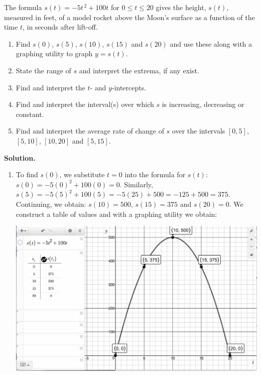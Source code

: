 \documentclass{ximera}
\begin{document}
\begin{example} \label{ARCRocketExample} The formula $s(t) = -5t^{\,2} + 100t$ for $0 \leq t \leq 20$ gives the height, $s(t)$, measured in feet, of a model rocket above the Moon's surface as a function of the time $t$, in seconds after lift-off.

\begin{enumerate}

\item Find $s(0)$, $s(5)$, $s(10)$, $s(15)$ and $s(20)$ and use these along with a graphing utility to graph $y = s(t)$.

\item State the range of $s$ and interpret the extrema, if any exist.

\item Find and interpret the $t$- and $y$-intercepts.  

\item Find and interpret the interval(s) over which $s$ is increasing, decreasing or constant.  

\item Find and interpret the average rate of change of $s$ over the intervals $[0,5]$, $[5,10]$, $[10, 20]$ and $[5, 15]$.


\end{enumerate}

{\bf Solution.}

\begin{enumerate}

\item  To find $s(0)$, we substitute $t=0$ into the formula for $s(t)$:  $s(0) = -5(0)^2+100(0) = 0$.  Similarly,  $s(5) = -5(5)^2+100(5) = -5(25)+500 = -125+500 = 375$.  Continuing, we obtain: $s(10) = 500$, $s(15) = 375$ and $s(20) = 0$.  We construct a table of values and with a graphing utility we obtain:

\begin{center}
\includegraphics[width=6in]{./ConstantandLinearFunctionsGraphics/ARCRocketExample01.jpg}


\end{center}
\end{enumerate}
\end{example}
\end{document}
